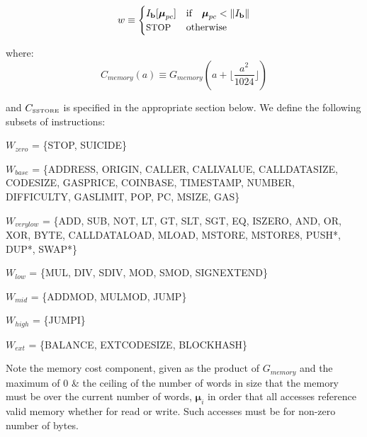 \documentclass[9pt,oneside]{amsart}
\begin{document}
\begin{equation}
w \equiv \begin{cases} I_\mathbf{b}[\boldsymbol{\mu}_{pc}] & \text{if} \quad \boldsymbol{\mu}_{pc} < \lVert I_\mathbf{b} \rVert\\
\text{\small STOP} & \text{otherwise}
\end{cases}
\end{equation}

where:
\begin{equation}
C_{memory}(a) \equiv G_{memory}(a + \Big\lfloor \dfrac{a^2}{1024} \Big\rfloor)
\end{equation}

and $C_\text{\tiny SSTORE}$ is specified in the appropriate section below. We define the following subsets of instructions:

$W_{zero}$ = \{{\small STOP}, {\small SUICIDE}\}

$W_{base}$ = \{{\small ADDRESS}, {\small ORIGIN}, {\small CALLER}, {\small CALLVALUE}, {\small CALLDATASIZE}, {\small CODESIZE}, {\small GASPRICE}, {\small COINBASE},\newline \noindent\hspace*{1cm} {\small TIMESTAMP}, {\small NUMBER}, {\small DIFFICULTY}, {\small GASLIMIT}, {\small POP}, {\small PC}, {\small MSIZE}, {\small GAS}\}

$W_{verylow}$ = \{{\small ADD}, {\small SUB}, {\small NOT}, {\small LT}, {\small GT}, {\small SLT}, {\small SGT}, {\small EQ}, {\small ISZERO}, {\small AND}, {\small OR}, {\small XOR}, {\small BYTE}, {\small CALLDATALOAD}, \newline \noindent\hspace*{1cm} {\small MLOAD}, {\small MSTORE}, {\small MSTORE8}, {\small PUSH*}, {\small DUP*}, {\small SWAP*}\}

$W_{low}$ = \{{\small MUL}, {\small DIV}, {\small SDIV}, {\small MOD}, {\small SMOD}, {\small SIGNEXTEND}\}

$W_{mid}$ = \{{\small ADDMOD}, {\small MULMOD}, {\small JUMP}\}

$W_{high}$ = \{{\small JUMPI}\}

$W_{ext}$ = \{{\small BALANCE}, {\small EXTCODESIZE}, {\small BLOCKHASH}\}

Note the memory cost component, given as the product of $G_{memory}$ and the maximum of 0 \& the ceiling of the number of words in size that the memory must be over the current number of words, $\boldsymbol{\mu}_i$ in order that all accesses reference valid memory whether for read or write. Such accesses must be for non-zero number of bytes.
\end{document}
